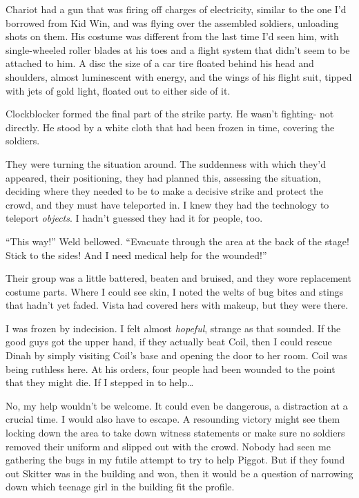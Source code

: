 Chariot had a gun that was firing off charges of electricity, similar to the one I'd borrowed from Kid Win, and was flying over the assembled soldiers, unloading shots on them.  His costume was different from the last time I'd seen him, with single-wheeled roller blades at his toes and a flight system that didn't seem to be attached to him.  A disc the size of a car tire floated behind his head and shoulders, almost luminescent with energy, and the wings of his flight suit, tipped with jets of gold light, floated out to either side of it.



Clockblocker formed the final part of the strike party.  He wasn't fighting- not directly.  He stood by a white cloth that had been frozen in time, covering the soldiers.



They were turning the situation around.  The suddenness with which they'd appeared, their positioning, they had planned this, assessing the situation, deciding where they needed to be to make a decisive strike and protect the crowd, and they must have teleported in.  I knew they had the technology to teleport \emph{objects}.  I hadn't guessed they had it for people, too.



``This way!''  Weld bellowed.  ``Evacuate through the area at the back of the stage!  Stick to the sides!  And I need medical help for the wounded!''



Their group was a little battered, beaten and bruised, and they wore replacement costume parts.  Where I could see skin, I noted the welts of bug bites and stings that hadn't yet faded.  Vista had covered hers with makeup, but they were there.



I was frozen by indecision.  I felt almost \emph{hopeful}, strange as that sounded.  If the good guys got the upper hand, if they actually beat Coil, then I could rescue Dinah by simply visiting Coil's base and opening the door to her room.  Coil was being ruthless here.  At his orders, four people had been wounded to the point that they might die.  If I stepped in to help\ldots



No, my help wouldn't be welcome.  It could even be dangerous, a distraction at a crucial time.  I would also have to escape.  A resounding victory might see them locking down the area to take down witness statements or make sure no soldiers removed their uniform and slipped out with the crowd.  Nobody had seen me gathering the bugs in my futile attempt to try to help Piggot.  But if they found out Skitter was in the building and won, then it would be a question of narrowing down which teenage girl in the building fit the profile.



